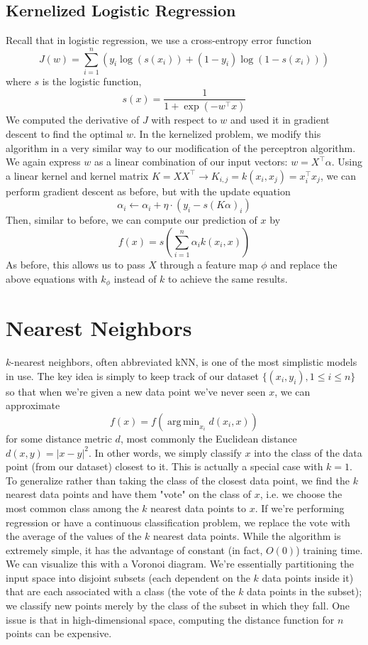 \documentclass{article}
\DeclareMathOperator*{\argmin}{arg\,min}
\begin{document}
\subsection{Kernelized Logistic Regression}
Recall that in logistic regression, we use a cross-entropy error function
$$ J(w) = \sum_{i = 1}^n (y_i \log(s(x_i)) + (1 - y_i) \log(1 - s(x_i))) $$
where $ s $ is the logistic function,
$$ s(x) = \frac{1}{1 + \exp(- w^\intercal x)} $$
We computed the derivative of $ J $ with respect to $ w $ and used it in gradient descent to find the optimal $ w $. In the kernelized problem, we modify this algorithm in a very similar way to our modification of the perceptron algorithm. We again express $ w $ as a linear combination of our input vectors: $ w = X^\intercal \alpha $. Using a linear kernel and kernel matrix $ K = X X^\intercal \rightarrow K_{i, j} = k(x_i, x_j) = x_i^\intercal x_j $, we can perform gradient descent as before, but with the update equation
$$ \alpha_i \gets \alpha_i + \eta \cdot (y_i - s(K \alpha)_i) $$
Then, similar to before, we can compute our prediction of $ x $ by
$$ f(x) = s \left( \sum_{i = 1}^n \alpha_i k(x_i, x) \right) $$
As before, this allows us to pass $ X $ through a feature map $ \phi $ and replace the above equations with $ k_\phi $ instead of $ k $ to achieve the same results.

\section{Nearest Neighbors}
$ k $-nearest neighbors, often abbreviated kNN, is one of the most simplistic models in use. The key idea is simply to keep track of our dataset $ \{ (x_i, y_i), 1 \leq i \leq n \} $ so that when we're given a new data point we've never seen $ x $, we can approximate
$$ f(x) = f \left( \argmin_{x_i} d(x_i, x) \right) $$
for some distance metric $ d $, most commonly the Euclidean distance $ d(x, y) = | x - y |^2 $. In other words, we simply classify $ x $ into the class of the data point (from our dataset) closest to it. This is actually a special case with $ k = 1 $. To generalize rather than taking the class of the closest data point, we find the $ k $ nearest data points and have them "vote" on the class of $ x $, i.e. we choose the most common class among the $ k $ nearest data points to $ x $. If we're performing regression or have a continuous classification problem, we replace the vote with the average of the values of the $ k $ nearest data points. While the algorithm is extremely simple, it has the advantage of constant (in fact, $ O(0) $) training time.
\newline
We can visualize this with a Voronoi diagram. We're essentially partitioning the input space into disjoint subsets (each dependent on the $ k $ data points inside it) that are each associated with a class (the vote of the $ k $ data points in the subset); we classify new points merely by the class of the subset in which they fall.
\newline
One issue is that in high-dimensional space, computing the distance function for $ n $ points can be expensive.
\end{document}
